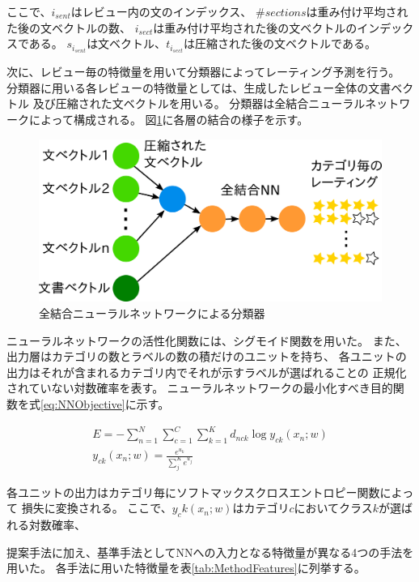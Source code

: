 \documentclass[twocolumn,a4paper]{ltjarticle}
\makeatletter
\let\tti@includegraphics\includegraphics
\renewcommand{\includegraphics}[1]{%
    \tti@includegraphics[width=\linewidth]{#1}}
\makeatother
\begin{document}
ここで、$i_{sent}$はレビュー内の文のインデックス、
$\#sections$は重み付け平均された後の文ベクトルの数、
$i_{sect}$は重み付け平均された後の文ベクトルのインデックスである。
$s_{i_{sent}}$は文ベクトル、$t_{i_{sect}}$は圧縮された後の文ベクトルである。

次に、レビュー毎の特徴量を用いて分類器によってレーティング予測を行う。
分類器に用いる各レビューの特徴量としては、生成したレビュー全体の文書ベクトル
及び圧縮された文ベクトルを用いる。
分類器は全結合ニューラルネットワークによって構成される。
図\ref{fig:MyModel}に各層の結合の様子を示す。

\begin{figure}
  \includegraphics{fig/model.png}
  \caption{全結合ニューラルネットワークによる分類器}
  \label{fig:MyModel}
\end{figure}

ニューラルネットワークの活性化関数には、シグモイド関数を用いた。
また、出力層はカテゴリの数とラベルの数の積だけのユニットを持ち、
各ユニットの出力はそれが含まれるカテゴリ内でそれが示すラベルが選ばれることの
正規化されていない対数確率を表す。
ニューラルネットワークの最小化すべき目的関数を式\ref{eq:NNObjective}に示す。

\begin{gather}
  E = - \sum^{N}_{n = 1} \sum^{C}_{c = 1} \sum^{K}_{k = 1}
        d_{nck} \log{y_{ck}(x_n; w)}
  \label{eq:NNObjective} \\
  y_{ck}(x_n; w) = \frac{e^{u_k}}{\sum^{K}_{j} e^{u_j}}
\end{gather}

各ユニットの出力はカテゴリ毎にソフトマックスクロスエントロピー関数によって
損失に変換される。
ここで、$y_ck(x_n; w)$はカテゴリ$c$においてクラス$k$が選ばれる対数確率、




提案手法に加え、基準手法としてNNへの入力となる特徴量が異なる4つの手法を用いた。
各手法に用いた特徴量を表\ref{tab:MethodFeatures}に列挙する。
\end{document}
